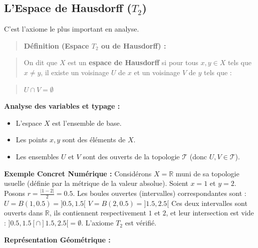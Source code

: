 \documentclass[11pt,a4paper]{article}
\begin{document}
\subsection{L'Espace de Hausdorff ($T_2$)}

C'est l'axiome le plus important en analyse.

\begin{quote}
\textbf{Définition (Espace $T_2$ ou de Hausdorff) :}
\end{quote}
\begin{quote}
On dit que $X$ est un \textbf{espace de Hausdorff} si pour tous $x, y \in X$ tels que $x \neq y$, il existe un voisinage $U$ de $x$ et un voisinage $V$ de $y$ tels que :
\end{quote}
\begin{quote}
$U \cap V = \emptyset$
\end{quote}

\textbf{Analyse des variables et typage :}
\begin{itemize}
\item L'espace $X$ est l'ensemble de base.

\item Les points $x, y$ sont des éléments de $X$.

\item Les ensembles $U$ et $V$ sont des ouverts de la topologie $\mathcal{T}$ (donc $U, V \in \mathcal{T}$).
\end{itemize}

\textbf{Exemple Concret Numérique :}
Considérons $X = \mathbb{R}$ muni de sa topologie usuelle (définie par la métrique de la valeur absolue).
Soient $x = 1$ et $y = 2$.
Posons $r = \frac{|1 - 2|}{2} = 0.5$.
Les boules ouvertes (intervalles) correspondantes sont :
$U = B(1, 0.5) = ]0.5, 1.5[$
$V = B(2, 0.5) = ]1.5, 2.5[$
Ces deux intervalles sont ouverts dans $\mathbb{R}$, ils contiennent respectivement $1$ et $2$, et leur intersection est vide : $]0.5, 1.5[ \cap ]1.5, 2.5[ = \emptyset$. L'axiome $T_2$ est vérifié.

\textbf{Représentation Géométrique :}
\begin{center}
\end{center}
\end{document}
